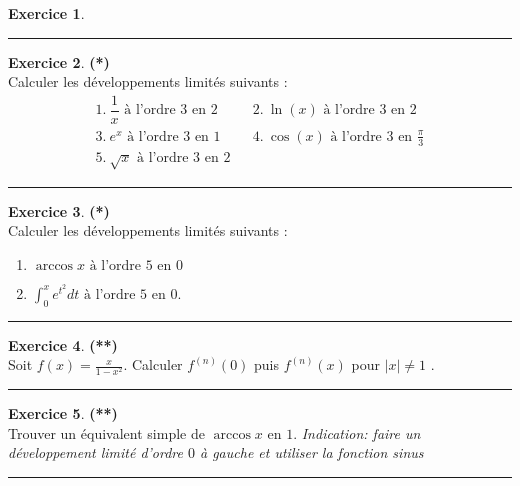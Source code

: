 \documentclass[a4paper,11pt]{article}
\theoremstyle{definition}
\newtheorem{exo}{Exercice} %
\begin{document}
\begin{minipage}{1\linewidth}
\begin{minipage}[t]{0.48\linewidth}
\begin{exo}
	
	
	
	\centering
	\rule{1\linewidth}{0.6pt}
\end{exo}

\end{minipage}	
\hfill\vrule\hfill
\begin{minipage}[t]{0.48\linewidth}
\raggedright

\begin{exo}\textbf{(*)}\quad\\[0.2cm]
	Calculer les développements limités suivants :
	$$\begin{array}{lcl}
	 1.\  \dfrac 1x\textrm{ à l'ordre 3 en }2&&\displaystyle 2. \ \ln(x)\textrm{ à l'ordre 3 en }2\\
	\displaystyle 3. \ e^x\textrm{ à l'ordre 3 en }1&&\displaystyle  4. \  \cos(x)\textrm{ à l'ordre 3 en }\frac{\pi}3\\
	\displaystyle  5. \ \sqrt x\textrm{ à l'ordre 3 en 2}
	\end{array}$$
	\centering
	\rule{1\linewidth}{0.6pt}
\end{exo}


\begin{exo}\textbf{(*)}\quad\\[0.2cm]
	Calculer les développements limités suivants :
	
			\begin{enumerate}
		\item $\displaystyle   \arccos x\textrm{ à l'ordre 5 en 0}$
		\item $\displaystyle   \int_0^x e^{t^2}dt\textrm{ à l'ordre 5 en 0}.$

	\end{enumerate}	

	
	
	\centering
	\rule{1\linewidth}{0.6pt}
\end{exo}


\begin{exo}\textbf{(**)}\quad\\[0.2cm]
	Soit $f(x)=\frac{x}{1-x^2}$. Calculer $f^{(n)}(0)$ puis $f^{(n)}(x)$ pour $|x|\neq1$ .

	
	
	\centering
	\rule{1\linewidth}{0.6pt}
\end{exo}

\begin{exo}\textbf{(**)}\quad\\[0.2cm]
	Trouver un équivalent simple de $\arccos x$ en $1$.
	\textit{Indication: faire un développement limité d'ordre $0$ à gauche et utiliser la fonction sinus}
	
	\centering
	\rule{1\linewidth}{0.6pt}
\end{exo}



\end{minipage}
\end{minipage}
\end{document}

